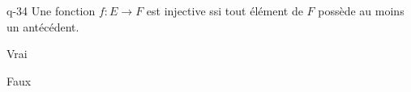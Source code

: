 \begin{truefalse}{q-34}
Une fonction $f : E\to F$ est injective ssi tout élément de $F$ possède au moins un antécédent.
\item Vrai
\item* Faux
\end{truefalse}

